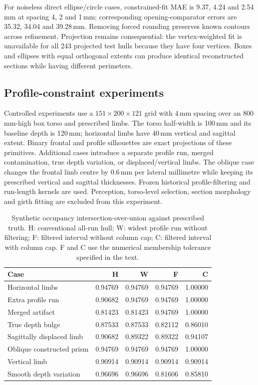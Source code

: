 \documentclass[11pt,a4paper]{article}
\begin{document}
For noiseless direct ellipse/circle cases, constrained-fit MAE is 9.37, 4.24 and 2.54\,mm at spacing 4, 2 and 1\,mm; corresponding opening-comparator errors are 35.32, 34.04 and 39.28\,mm. Removing forced rounding preserves known contours across refinement. Projection remains consequential: the vertex-weighted fit is unavailable for all 243 projected test hulls because they have four vertices. Boxes and ellipses with equal orthogonal extents can produce identical reconstructed sections while having different perimeters.

\subsection{Profile-constraint experiments}
Controlled experiments use a $151\times200\times121$ grid with 4\,mm spacing over an 800\,mm-high box torso and prescribed limbs. The torso half-width is 100\,mm and its baseline depth is 120\,mm; horizontal limbs have 40\,mm vertical and sagittal extent. Binary frontal and profile silhouettes are exact projections of these primitives. Additional cases introduce a separate profile run, merged contamination, true depth variation, or displaced/vertical limbs. The oblique case changes the frontal limb centre by 0.6\,mm per lateral millimetre while keeping its prescribed vertical and sagittal thicknesses. Frozen historical profile-filtering and run-length kernels are used. Perception, torso-level selection, section morphology and girth fitting are excluded from this experiment.

\begin{table}[htbp]
\centering
\caption{Synthetic occupancy intersection-over-union against prescribed truth. H: conventional all-run hull; W: widest profile run without filtering; F: filtered interval without column cap; C: filtered interval with column cap. F and C use the numerical membership tolerance specified in the text.}
\label{tab:synthetic}
\small
\begin{tabular}{lrrrr}
\toprule
Case & H & W & F & C\\
\midrule
Horizontal limbs &0.94769&0.94769&0.94769&1.00000\\
Extra profile run &0.90682&0.94769&0.94769&1.00000\\
Merged artifact &0.81423&0.81423&0.94769&1.00000\\
True depth bulge &0.87533&0.87533&0.82112&0.86010\\
Sagittally displaced limb &0.90682&0.89322&0.89322&0.94107\\
Oblique constructed prism &0.94769&0.94769&0.94769&1.00000\\
Vertical limb &0.90914&0.90914&0.90914&0.90914\\
Smooth depth variation &0.96696&0.96696&0.81606&0.85810\\
\bottomrule
\end{tabular}
\end{table}
\end{document}

